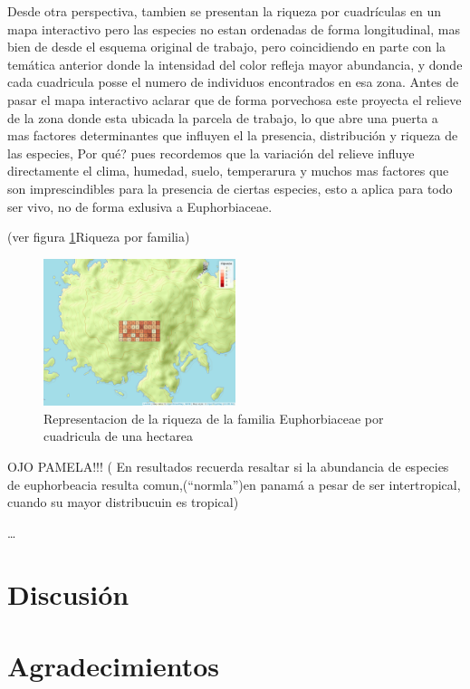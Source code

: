 \documentclass[11pt,]{article}
\begin{document}
Desde otra perspectiva, tambien se presentan la riqueza por cuadrículas
en un mapa interactivo pero las especies no estan ordenadas de forma
longitudinal, mas bien de desde el esquema original de trabajo, pero
coincidiendo en parte con la temática anterior donde la intensidad del
color refleja mayor abundancia, y donde cada cuadricula posse el numero
de individuos encontrados en esa zona. Antes de pasar el mapa
interactivo aclarar que de forma porvechosa este proyecta el relieve de
la zona donde esta ubicada la parcela de trabajo, lo que abre una puerta
a mas factores determinantes que influyen el la presencia, distribución
y riqueza de las especies, Por qué? pues recordemos que la variación del
relieve influye directamente el clima, humedad, suelo, temperarura y
muchos mas factores que son imprescindibles para la presencia de ciertas
especies, esto a aplica para todo ser vivo, no de forma exlusiva a
Euphorbiaceae.

(ver figura \ref{fig:cuadro_de_riqueza_familia}Riqueza por familia)

\begin{figure}
\centering
\includegraphics[width=0.50000\textwidth]{mapa_cuadros_riq_mi_familia.png}
\caption{\label{fig:cuadro_de_riqueza_familia}Representacion de la
riqueza de la familia Euphorbiaceae por cuadricula de una hectarea}
\end{figure}

OJO PAMELA!!! ( En resultados recuerda resaltar si la abundancia de
especies de euphorbeacia resulta comun,(``normla'')en panamá a pesar de
ser intertropical, cuando su mayor distribucuin es tropical)

\ldots

\section{Discusión}\label{discusiuxf3n}

\section{Agradecimientos}\label{agradecimientos}
\end{document}
